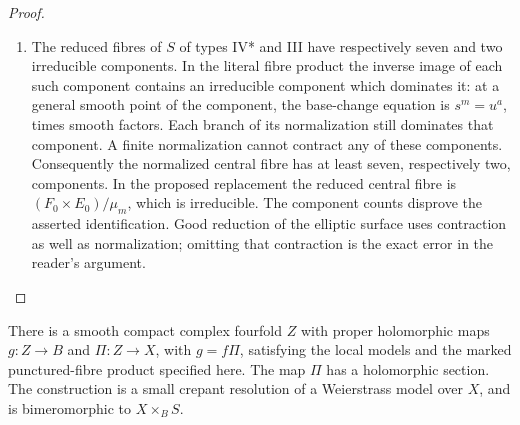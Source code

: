 \begin{proof}
\begin{enumerate}[label=\arabic*.,leftmargin=*]
\item The reduced fibres of $S$ of types IV* and III have respectively seven
and two irreducible components.  In the literal fibre product the inverse
image of each such component contains an irreducible component which
dominates it: at a general smooth point of the component, the base-change
equation is $s^m=u^a$, times smooth factors.  Each branch of its
normalization still dominates that component.  A finite normalization
cannot contract any of these components.  Consequently the normalized
central fibre has at least seven, respectively two, components.  In the
proposed replacement the reduced central fibre is
$(F_0\times E_0)/\mu_m$, which is irreducible.  The component counts
disprove the asserted identification.  Good reduction of the elliptic
surface uses contraction as well as normalization; omitting that
contraction is the exact error in the reader's argument.
\end{enumerate}
\end{proof}

\begin{theorem}\label{maps:src:E.1.2}


There is a smooth compact complex fourfold $Z$ with proper holomorphic
maps $g:Z\to B$ and $\Pi:Z\to X$, with $g=f\Pi$, satisfying the local
models and the marked punctured-fibre product specified here.  The map $\Pi$
has a holomorphic section.  The construction is a small crepant
resolution of a Weierstrass model over $X$, and is bimeromorphic to
$X\times_B S$.

\end{theorem}


